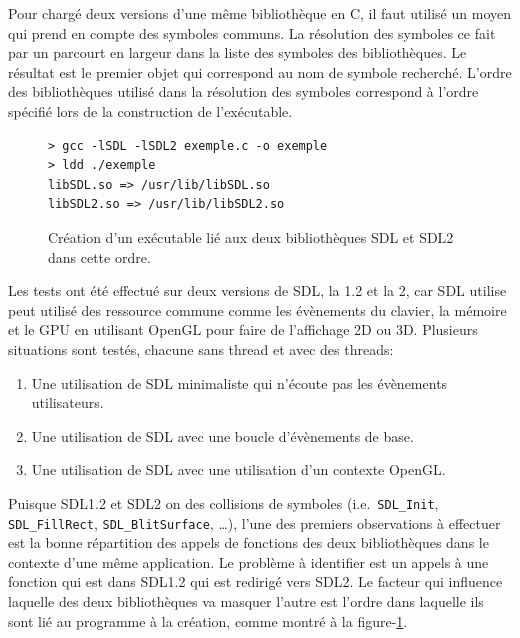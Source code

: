 \documentclass[12pt,initial,twoside,maitrise]{dms}
\numberwithin{equation}{section}
\numberwithin{table}{chapter}
\numberwithin{figure}{chapter}
\begin{document}
Pour chargé deux versions d'une même bibliothèque en C, il faut utilisé un moyen
qui prend en compte des symboles communs. La résolution des symboles ce fait
par un parcourt en largeur dans la liste des symboles des bibliothèques.
Le résultat est le premier objet qui correspond au nom de symbole recherché.
L'ordre des bibliothèques utilisé dans la résolution des symboles correspond
à l'ordre spécifié lors de la construction de l'exécutable.
\begin{center}
\begin{figure}[ht]
\begin{lstlisting}[frame=single]
> gcc -lSDL -lSDL2 exemple.c -o exemple
> ldd ./exemple
libSDL.so => /usr/lib/libSDL.so
libSDL2.so => /usr/lib/libSDL2.so
\end{lstlisting}
\caption{Création d'un exécutable lié aux deux bibliothèques
SDL et SDL2 dans cette ordre.}
\label{fig:sdl_mask_sdl2}
\end{figure}
\end{center}
Les tests ont été effectué sur deux versions de SDL, la 1.2 et la 2, car SDL utilise
peut utilisé des ressource commune comme les évènements du clavier, la mémoire et
le GPU en utilisant OpenGL pour faire de l'affichage 2D ou 3D.
Plusieurs situations sont testés, chacune sans thread et avec des threads:
\begin{enumerate}
    \item Une utilisation de SDL minimaliste qui n'écoute pas les évènements utilisateurs.
    \item Une utilisation de SDL avec une boucle d'évènements de base.
    \item Une utilisation de SDL avec une utilisation d'un contexte OpenGL.
\end{enumerate}

Puisque SDL1.2 et SDL2 on des collisions de symboles (i.e.\ \verb+SDL_Init+, \verb+SDL_FillRect+, \verb+SDL_BlitSurface+,
\dots), l'une des premiers observations à effectuer est la bonne répartition des appels de fonctions des deux bibliothèques
dans le contexte d'une même application. Le problème à identifier est un appels à une fonction qui est dans SDL1.2 qui est redirigé
vers SDL2. Le facteur qui influence laquelle des deux bibliothèques va masquer l'autre est l'ordre dans laquelle
ils sont lié au programme à la création, comme montré à la figure-\ref{fig:sdl_mask_sdl2}.
\end{document}
